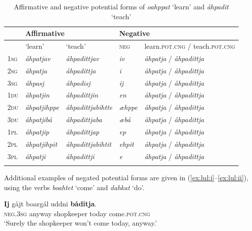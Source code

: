 \documentclass[output=paper,colorlinks,citecolor=brown]{langscibook}
\begin{document}
\begin{table}

\begin{tabularx}{\textwidth}{llX ll@{}}
\lsptoprule
& \multicolumn{2}{l}{Affirmative} & \multicolumn{2}{l}{Negative} \\
\midrule
& {‘learn’}  & {‘teach’} & {\textsc{neg}} & {learn.\textsc{pot.cng} / teach\textsc{.pot.cng}}\\
{\textsc{1sg}} & {\textit{åhpatjav}} & {\textit{åhpadittjav}} & {\textit{iv}} & {\textit{åhpatja} / \textit{åhpadittja}}\\
{\textsc{2sg}} & {\itshape åhpatja} & {\textit{åhpadittja}} & {\textit{i}} & {\textit{åhpatja} / \textit{åhpadittja}}\\
{\textsc{3sg}} & {\itshape åhpasj} & {\textit{åhpadisj}} & {\textit{ij}} & {\textit{åhpatja} / \textit{åhpadittja}}\\
{\textsc{1du}} & {\itshape åhpatjin} & {\textit{åhpadittjin}} & {\textit{en}} & {\textit{åhpatja} / \textit{åhpadittja}}\\
{\textsc{2du}} & {\itshape åhpatjihppe} & {\textit{åhpadittjabihtte}} & {\textit{æhppe}} & {\textit{åhpatja} / \textit{åhpadittja}}\\
{\textsc{3du}} & {\itshape åhpatjibá} & {\textit{åhpadittjaba}} & {\textit{æbá}} & {\textit{åhpatja} / \textit{åhpadittja}}\\
{\textsc{1pl}} & {\itshape åhpatjip} & {\textit{åhpadittjap}} & {\textit{ep}} & {\textit{åhpatja} / \textit{åhpadittja}}\\
{\textsc{2pl}} & {\itshape åhpatjihpit} & {\textit{åhpadittjabihtit}} & {\textit{ehpit}} & {\textit{åhpatja} / \textit{åhpadittja}}\\
{\textsc{3pl}} & {\itshape åhpatji} & {\textit{åhpadittji}} & {\textit{e}} & {\textit{åhpatja} / \textit{åhpadittja}}\\
\lspbottomrule
\end{tabularx}
    \caption{Affirmative and negative potential forms of \textit{oahppat} ‘learn’ and \textit{åhpadit} ‘teach’}
    \label{tab:lul:3}
\end{table}


Additional examples of negated potential forms are given in (\ref{ex:lul:i}--\ref{ex:lul:ii}), using the verbs \textit{boahtet} ‘come’ and \textit{dahkat} ‘do’.

\ea\label{ex:lul:i}
\gll  \textbf{Ij} gåjt boargál uddni \textbf{båditja}.\\
    \textsc{neg.3sg} anyway shopkeeper today come.\textsc{pot.cng} \\
\glt ‘Surely the shopkeeper won’t come today, anyway.’  \citep{SIKOR2021}\\
\z
\end{document}
